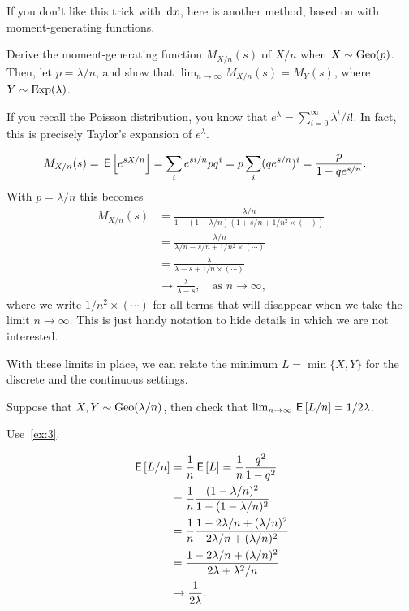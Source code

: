 If you don't like this trick with $\,\textrm{d}x$, here is another method, based on with moment-generating functions.

\begin{exercise}
Derive the moment-generating function $M_{X/n}(s)$ of $X/n$ when $X\sim \mathrm{Geo}(p)$.
Then, let $p = \lambda/n$, and show that $\lim_{n\to\infty}M_{X/n}(s) = M_{Y}(s)$, where $Y \sim \mathrm{Exp}(\lambda)$.
\begin{hint}
  If you recall the Poisson distribution, you know that $e^{\lambda} = \sum_{i=0}^{\infty}\lambda^{i}/i!$.
  In fact, this is precisely Taylor's expansion of $e^{\lambda}$.
\end{hint}
\begin{solution}
  \begin{align*}
M_{X/n}(s)
&= \,\mathsf{E}\left[e^{s X/n}\right] = \sum_{i} e^{s i/n} p q^{i} = p\sum_{i} (qe^{s/n})^{i} = \frac{p}{1-qe^{s/n}}.
  \end{align*}
With $p=\lambda/n$ this becomes
  \begin{align*}
M_{X/n}(s)
&= \frac{\lambda/n}{1-(1-\lambda/n) (1+s/n + 1/n^{2}\times(\cdots))} \\
&= \frac{\lambda/n}{\lambda/n - s/n + 1/n^{2}\times (\cdots)} \\
&= \frac{\lambda}{\lambda - s + 1/n\times(\cdots)} \\
&\to \frac{\lambda}{\lambda - s}, \quad\text{as }  n\to \infty,
  \end{align*}
  where we write $1/n^{2}\times(\cdots)$ for all terms that will disappear when we take the limit $n\to \infty$.
  This is just handy notation to hide details in which we are not interested.
\end{solution}
\end{exercise}

With these limits in place, we can relate the minimum $L=\min\{X, Y\}$ for the discrete and the continuous settings.

\begin{exercise}
Suppose that $X, Y\sim \mathrm{Geo}(\lambda/n)$, then check that $\lim_{n\to\infty}\,\mathsf{E}\left[L/n\right] = 1/2\lambda$.
\begin{hint}
  Use~\cref{ex:3}.
\end{hint}
\begin{solution}
  \begin{align*}
\,\mathsf{E}\left[L/n\right]  &= \frac 1 n \,\mathsf{E}\left[L\right] = \frac 1 n \frac{q^2}{1-q^{2}} \\
 &= \frac 1 n \frac{(1-\lambda/n)^2}{1-(1-\lambda/n)^{2}} \\
 &= \frac 1 n \frac{1-2 \lambda/n + (\lambda/n)^2}{2 \lambda /n + (\lambda/n)^{2}} \\
 &= \frac{1-2 \lambda/n + (\lambda/n)^2}{2 \lambda + \lambda^{2}/n} \\
&\to \frac 1{2\lambda}.
  \end{align*}
\end{solution}
\end{exercise}


